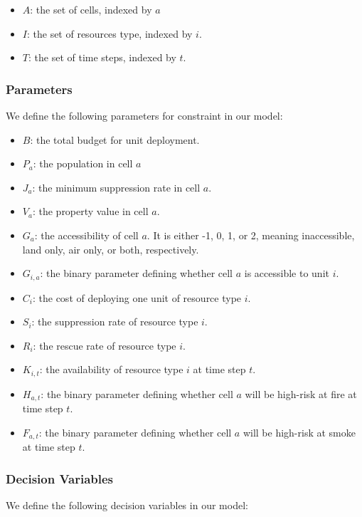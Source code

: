 \begin{itemize}
    \item $A$: the set of cells, indexed by $a$ 
    \item $I$: the set of resources type, indexed by $i$. 
    \item $T$: the set of time steps, indexed by $t$.
\end{itemize}

\subsubsection{Parameters}
We define the following parameters for constraint in our model: 

\begin{itemize}
    \item $B$: the total budget for unit deployment.

    \item $P_a$: the population in cell $a$ 
    \item $J_a$: the minimum suppression rate in cell $a$. 
    \item $V_a$: the property value in cell $a$.

    \item $G_a$: the accessibility of cell $a$. It is either -1, 0, 1, or 2, meaning inaccessible, land only, air only, or both, respectively. 
    \item $G_{i,a}$: the binary parameter defining whether cell $a$ is accessible to unit $i$. 

    \item $C_i$: the cost of deploying one unit of resource type $i$. 
    \item $S_i$: the suppression rate of resource type $i$.
    \item $R_i$: the rescue rate of resource type $i$.

    \item $K_{i,t}$: the availability of resource type $i$ at time step $t$.
    
    \item $H_{a,t}$: the binary parameter defining whether cell $a$ will be high-risk at fire at time step $t$. 
    \item $F_{a,t}$: the binary parameter defining whether cell $a$ will be high-risk at smoke at time step $t$. 
\end{itemize}

\subsubsection{Decision Variables}
We define the following decision variables in our model:

